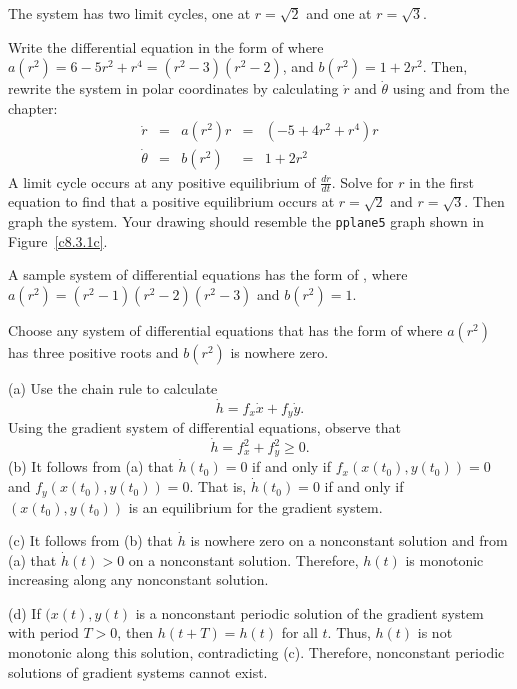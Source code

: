 \ans The system has two limit cycles, one at $r = \sqrt{2}$ and one
at $r = \sqrt{3}$. 

\soln Write the differential equation in the form of 
where $a(r^2) = 6 - 5r^2 + r^4=(r^2-3)(r^2-2)$, and 
$b(r^2) = 1+2r^2$.  Then,
rewrite the system in polar coordinates by calculating $\dot{r}$ and
$\dot{\theta}$ using  and  from the
chapter:
\[ 
\begin{array}{rcccl}
\dot{r} & = & a(r^2)r & = & (-5 + 4r^2 + r^4)r \\
\dot{\theta} & = & b(r^2) & = & 1+2r^2 \end{array}
\]
A limit cycle occurs at any positive equilibrium of $\frac{dr}{dt}$.
Solve for $r$ in the first equation to find that a positive equilibrium 
occurs at $r = \sqrt{2}$ and $r = \sqrt{3}$.  Then graph the system.  Your 
drawing should resemble the {\tt pplane5} graph shown in Figure~\ref{c8.3.1c}.

\begin{figure}[htb]
                       \centerline{%
                       }
\end{figure}

\newpage
{}
\soln A sample system of differential equations has the form of 
, where $a(r^2) = (r^2-1)(r^2-2)(r^2-3)$
and $b(r^2) = 1$.

\soln  Choose any system of differential equations that has the form of 
 where $a(r^2)$ has three positive roots
and $b(r^2)$ is nowhere zero.


\soln (a)  Use the chain rule to calculate
\[
\dot{h} = f_x\dot{x}+f_y\dot{y}.
\]
Using the gradient system of differential equations, observe that
\[
\dot{h} = f_x^2 + f_y^2\ge 0.
\]
(b) It follows from (a) that $\dot{h}(t_0)=0$ if and only if 
$f_x(x(t_0),y(t_0))=0$ and $f_y(x(t_0),y(t_0))=0$.  That is, 
$\dot{h}(t_0)=0$ if and only if $(x(t_0),y(t_0))$ is an equilibrium for the
gradient system.

\noindent (c) It follows from (b) that $\dot{h}$ is nowhere zero on a
nonconstant solution and from (a) that $\dot{h}(t)>0$ on a nonconstant
solution.  Therefore, $h(t)$ is monotonic increasing along any nonconstant
solution.

\noindent (d)  If $(x(t),y(t)$ is a nonconstant periodic solution of the
gradient system with period $T>0$, then $h(t+T)=h(t)$ for all $t$.  Thus,
$h(t)$ is not monotonic along this solution, contradicting (c).  Therefore,
nonconstant periodic solutions of gradient systems cannot exist.  

